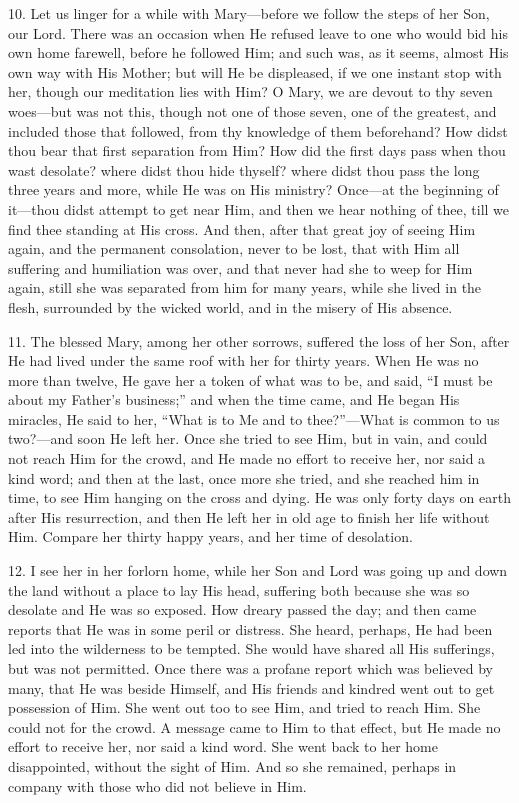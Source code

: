 10. Let us linger for a while
with Mary—before we follow the steps of her Son, our Lord. There was
an occasion when He refused leave to one who would bid his own home
farewell, before he followed Him; and such was, as it seems, almost His
own way with His Mother; but will He be displeased, if we one instant
stop with her, though our meditation lies with Him? O Mary, we are
devout to thy seven woes—but was not this, though not one of those
seven, one of the greatest, and included those that followed, from thy
knowledge of them beforehand? How didst thou bear that first separation
from Him? How did the first days pass when thou wast desolate? where
didst thou hide thyself? where didst thou pass the long three years and
more, while He was on His ministry? Once—at the beginning of
it—thou didst attempt to get near Him, and then we hear nothing of
thee, till we find thee standing at His cross. And then, after that
great joy of seeing Him again, and the permanent consolation, never to
be lost, that with Him all suffering and humiliation was over, and that
never had she to weep for Him again, still she was separated from him
for many years, while she lived in the flesh, surrounded by the wicked
world, and in the misery of His absence.

11. The blessed Mary, among her
other sorrows, suffered the loss of her Son, after He had lived under
the same roof with her for thirty years. When He was no more than
twelve, He gave her a token of what was to be, and said, ``I must be
about my Father's business;'' and when the time came, and He began His
miracles, He said to her, ``What is to Me and to thee?''—What is common
to us two?—and soon He left her. Once she tried to see Him, but in
vain, and could not reach Him for the crowd, and He made no effort to
receive her, nor said a kind word; and then at the last, once more she
tried, and she reached him in time, to see Him hanging on the cross and
dying. He was only forty days on earth after His resurrection, and then
He left her in old age to finish her life without Him. Compare her
thirty happy years, and her time of desolation.

12. I see her in her forlorn
home, while her Son and Lord was going up and down the land without a
place to lay His head, suffering both because she was so desolate and He
was so exposed. How dreary passed the day; and then came reports
that He was in some peril or distress. She heard, perhaps, He had been
led into the wilderness to be tempted. She would have shared all His
sufferings, but was not permitted. Once there was a profane report which
was believed by many, that He was beside Himself, and His friends and
kindred went out to get possession of Him. She went out too to see Him,
and tried to reach Him. She could not for the crowd. A message came to
Him to that effect, but He made no effort to receive her, nor said a
kind word. She went back to her home disappointed, without the sight of
Him. And so she remained, perhaps in company with those who did not
believe in Him.

